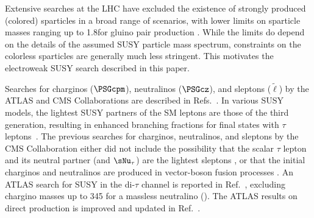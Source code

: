 Extensive searches at the LHC have excluded the existence of strongly produced (colored) sparticles in a broad range of scenarios,
with lower limits on sparticle masses ranging up to 1.8\TeV for gluino pair production
\cite{Chatrchyan:2013fea,Chatrchyan:2013mys,Chatrchyan:2014aea,Chatrchyan:2014lfa,Khachatryan:2015vra,Khachatryan:2015lwa,Aad:2015pfx,Aad:2015iea}.
While the limits do depend on the details of the assumed SUSY particle mass spectrum,
constraints on the colorless sparticles are generally much less stringent.
This motivates the electroweak SUSY search described in this paper.


Searches for charginos ($\PSGcpm$), neutralinos ($\PSGcz$), and sleptons ($\widetilde{\ell}$) by the ATLAS and CMS Collaborations are described in Refs.~\cite{Aad:2014nua,Aad:2014vma,Khachatryan:2014qwa,Khachatryan:2014mma,Khachatryan:2015kxa,Aad:2014yka,Aad:2015eda}.
In various SUSY models, the lightest SUSY partners of the SM leptons are those of the third generation,
resulting in enhanced branching fractions for final states with $\tau$ leptons~\cite{Martin:1997ns}.
The previous searches for charginos, neutralinos, and sleptons by the CMS Collaboration  either did not include the possibility that
the scalar $\tau$ lepton and its neutral partner (\PSGt and $\sNu_\tau$)
are the lightest sleptons \cite{Khachatryan:2014qwa}, or that the initial charginos and neutralinos are produced in vector-boson fusion processes \cite{Khachatryan:2015kxa}. An ATLAS search for SUSY in the di-$\tau$ channel is reported in Ref.~\cite{Aad:2014yka}, excluding chargino masses up to 345\GeV
for a massless neutralino (\PSGczDo).
The ATLAS results on direct \PSGt production is improved and updated in Ref.~\cite{Aad:2015eda}.

